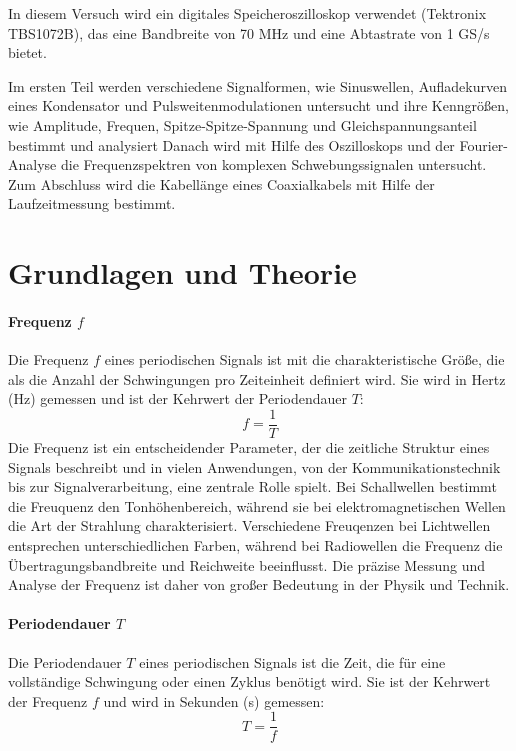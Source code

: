 \documentclass[12pt,a4paper,titlepage]{scrartcl}
\numberwithin{equation}{section}
\numberwithin{table}{section}
\numberwithin{figure}{section}
\begin{document}
In diesem Versuch wird ein digitales Speicheroszilloskop verwendet (Tektronix TBS1072B), das eine Bandbreite von 70 MHz und eine Abtastrate von 1 GS/s bietet.

Im ersten Teil werden verschiedene Signalformen, wie Sinuswellen, Aufladekurven eines Kondensator und Pulsweitenmodulationen untersucht und ihre Kenngrößen, wie Amplitude, Frequen, Spitze-Spitze-Spannung und Gleichspannungsanteil bestimmt und analysiert
Danach wird mit Hilfe des Oszilloskops und der Fourier-Analyse die Frequenzspektren von komplexen Schwebungssignalen untersucht. 
Zum Abschluss wird die Kabellänge eines Coaxialkabels mit Hilfe der Laufzeitmessung bestimmt.


\section{Grundlagen und Theorie}\label{Grundlagen}
\paragraph{Frequenz $f$}
Die Frequenz $f$ eines periodischen Signals ist mit die charakteristische Größe, die als die Anzahl der Schwingungen pro Zeiteinheit definiert wird. Sie wird in Hertz (Hz) gemessen und ist der Kehrwert der Periodendauer $T$:
\begin{equation}
    f = \frac{1}{T}
\end{equation}
Die Frequenz ist ein entscheidender Parameter, der die zeitliche Struktur eines Signals beschreibt und in vielen Anwendungen, von der Kommunikationstechnik bis zur Signalverarbeitung, eine zentrale Rolle spielt. Bei Schallwellen bestimmt die Freuquenz den Tonhöhenbereich, während sie bei elektromagnetischen Wellen die Art der Strahlung charakterisiert. Verschiedene Freuqenzen bei Lichtwellen entsprechen unterschiedlichen Farben, während bei Radiowellen die Frequenz die Übertragungsbandbreite und Reichweite beeinflusst. Die präzise Messung und Analyse der Frequenz ist daher von großer Bedeutung in der Physik und Technik.

\paragraph{Periodendauer $T$}
Die Periodendauer $T$ eines periodischen Signals ist die Zeit, die für eine vollständige Schwingung oder einen Zyklus benötigt wird. Sie ist der Kehrwert der Frequenz $f$ und wird in Sekunden (s) gemessen:
\begin{equation}
    T = \frac{1}{f}
\end{equation}
\end{document}
